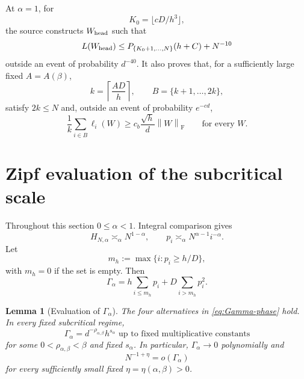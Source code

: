 \documentclass[11pt]{article}
\newtheorem{lemma}[theorem]{Lemma}
\theoremstyle{remark}
\newcommand{\norm}[1]{\left\lVert #1\right\rVert}
\newcommand{\Frob}{\mathrm F}
\begin{document}
At \(\alpha=1\), for
\[
 K_0=\lfloor cD/h^3\rfloor,
\]
the source constructs \(W_{\rm head}\) such that
\begin{equation}
 L(W_{\rm head})
 \leq P_{\{K_0+1,\ldots,N\}}(h+C)+N^{-10}
 \label{eq:endpoint-comparator}
\end{equation}
outside an event of probability \(d^{-40}\).
It also proves that, for a sufficiently large fixed \(A=A(\beta)\),
\[
 k=\left\lceil\frac{AD}{h}\right\rceil,\qquad
 B=\{k+1,\ldots,2k\},
 \label{eq:block-def}
\]
satisfy \(2k\leq N\) and, outside an event of probability \(e^{-cd}\),
\begin{equation}
 \frac1k\sum_{i\in B}\ell_i(W)
 \geq c_b\frac{\sqrt h}{d}\norm W_{\Frob}
 \qquad\text{for every }W.
 \label{eq:block-coercivity}
\end{equation}

\section{Zipf evaluation of the subcritical scale}
\label{sec:zipf}

Throughout this section \(0\leq\alpha<1\).  Integral comparison gives
\begin{equation}
 H_{N,\alpha}\asymp_\alpha N^{1-\alpha},
 \qquad
 p_i\asymp_\alpha N^{\alpha-1}i^{-\alpha}.
 \label{eq:zipf-subcritical}
\end{equation}
Let
\[
 m_h:=\max\{i:p_i\geq h/D\},
\]
with \(m_h=0\) if the set is empty.  Then
\begin{equation}
 \Gamma_\alpha
 =h\sum_{i\leq m_h}p_i+D\sum_{i>m_h}p_i^2.
 \label{eq:Gamma-split}
\end{equation}

\begin{lemma}[Evaluation of \(\Gamma_\alpha\)]
\label{lem:Gamma-evaluation}
The four alternatives in \eqref{eq:Gamma-phase} hold.  In every fixed
subcritical regime,
\[
 \Gamma_\alpha=d^{-\rho_{\alpha,\beta}}h^{s_\alpha}
\text{ up to fixed multiplicative constants}
\]
for some \(0<\rho_{\alpha,\beta}<\beta\) and fixed \(s_\alpha\).
In particular, \(\Gamma_\alpha\to0\) polynomially and
\[
 N^{-1+\eta}=o(\Gamma_\alpha)
\]
for every sufficiently small fixed
\(\eta=\eta(\alpha,\beta)>0\).
\end{lemma}
\end{document}
